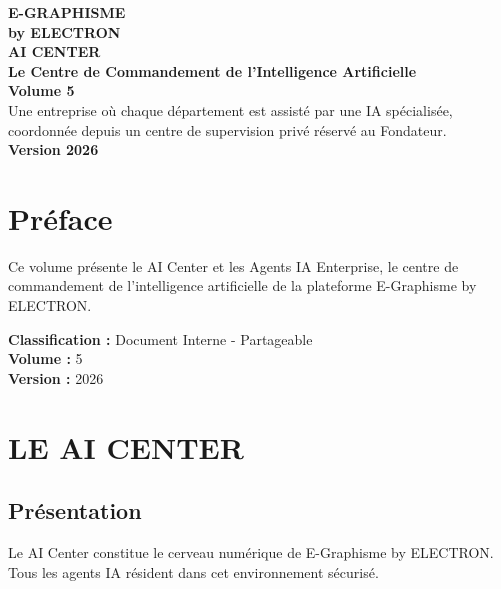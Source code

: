 \documentclass[12pt,a4paper,oneside]{book}
\begin{document}
\begin{titlepage}
\thispagestyle{empty}
\begin{center}
\vspace*{2cm}
{\Huge\bfseries\color{electronblue}E-GRAPHISME}\\[0.3cm]
{\LARGE\bfseries\color{electronpurple}by ELECTRON}\\[2cm]
\vspace{2cm}
{\huge\bfseries\color{darkbg}AI CENTER}\\[0.3cm]
{\huge\bfseries\color{darkbg}Le Centre de Commandement de l'Intelligence Artificielle}\\[1cm]
{\Large\bfseries\color{electroncyan}Volume 5}\\[3cm]
\vspace{2cm}
{\Large\color{mediumgray}Une entreprise où chaque département est assisté par une IA spécialisée,}\\[0.5cm]
{\Large\color{mediumgray}coordonnée depuis un centre de supervision privé réservé au Fondateur.}\\[3cm]
{\Large\bfseries\color{electrongold}Version 2026}\\[2cm]
\vfill
\end{center}
\end{titlepage}

\frontmatter

\chapter*{Préface}
Ce volume présente le AI Center et les Agents IA Enterprise, le centre de commandement de l'intelligence artificielle de la plateforme E-Graphisme by ELECTRON.

\bigskip
\textbf{Classification :} Document Interne - Partageable\\
\textbf{Volume :} 5\\
\textbf{Version :} 2026

\tableofcontents

\mainmatter

\chapter{LE AI CENTER}

\section{Présentation}
Le AI Center constitue le cerveau numérique de E-Graphisme by ELECTRON. Tous les agents IA résident dans cet environnement sécurisé.
\end{document}
